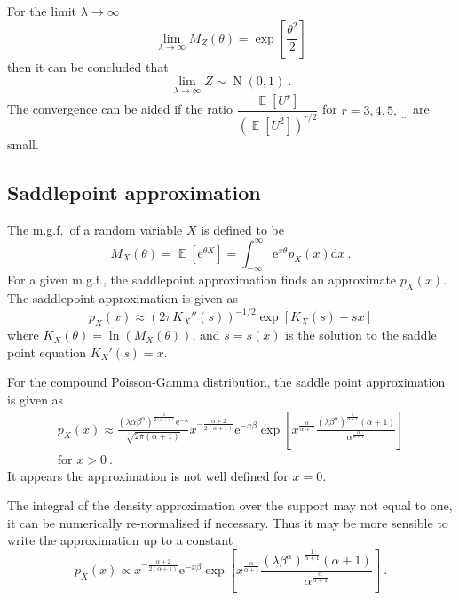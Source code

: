 \documentclass[12pt, a4paper]{memoir}
\DeclareMathOperator{\expectation}{\mathbb{E}}
\DeclareMathOperator{\normal}{N}
\newcommand{\euler}{\mathrm{e}}
\newcommand{\diff}{\mathrm{d}}
\newcommand{\dotdotdot}{_{\phantom{.}\cdots}}
\begin{document}
For the limit $\lambda\rightarrow\infty$
\begin{equation}
	\lim_{\lambda\rightarrow\infty}M_Z(\theta) = \exp\left[\frac{\theta^2}{2}\right]
\end{equation}
then it can be concluded that
\begin{equation}
	\lim_{\lambda\rightarrow\infty}Z\sim\normal(0,1)
	\ .
\end{equation}
The convergence can be aided if the ratio $\dfrac{\expectation[U^r]}{(\expectation[U^2])^{r/2}}$ for $r=3,4,5,\dotdotdot$ are small.

\subsection{Saddlepoint approximation}
The m.g.f.~of a random variable $X$ is defined to be
\begin{equation}
	M_X(\theta)=\expectation[\euler^{\theta X}]
	=
	\int_{-\infty}^{\infty}\euler^{x\theta} p_X(x) \diff x
	\ .
\end{equation}
For a given m.g.f., the saddlepoint approximation \citep{daniels1954saddlepoint} \citep{butler2007saddlepoint} finds an approximate $p_X(x)$. The saddlepoint approximation is given as
\begin{equation}
	p_X(x)\approx\left(2\pi K_X''(s)\right)^{-1/2}\exp\left[K_X(s)-sx\right]
	\label{eq:saddlePoint:generalSaddlePoint}
\end{equation}
where $K_X(\theta) = \ln\left(M_X(\theta)\right)$, and $s=s(x)$ is the solution to the saddle point equation $K_X'(s)=x$.

For the compound Poisson-Gamma distribution, the saddle point approximation is given as 
\begin{multline}
	p_X(x)\approx
	\frac{\left(\lambda\alpha\beta^\alpha\right)^{\frac{1}{2(\alpha+1)}}\euler^{-\lambda}}{\sqrt{2\pi(\alpha+1)}}x^{-\frac{\alpha+2}{2(\alpha+1)}}
	\euler^{-x\beta}
	\exp\left[x^{\frac{\alpha}{\alpha+1}}
		\frac{(\lambda\beta^\alpha)^{\frac{1}{\alpha+1}}(\alpha+1)}{\alpha^{\frac{\alpha}{\alpha+1}}}
	\right]
	\\
	\text{for }x>0 \ .
	\label{eq:saddle_point_approx}
\end{multline}
It appears the approximation is not well defined for $x=0$.

The integral of the density approximation over the support may not equal to one, it can be numerically re-normalised if necessary. Thus it may be more sensible to write the approximation up to a constant
\begin{equation}
	p_X(x)\propto x^{-\frac{\alpha+2}{2(\alpha+1)}}\euler^{-x\beta}
	\exp\left[
		x^{\frac{\alpha}{\alpha+1}}
		\frac{
			(\lambda\beta^\alpha)^{\frac{1}{\alpha+1}}(\alpha+1)
		}
		{
			\alpha^{\frac{\alpha}{\alpha+1}}
		}
	\right]
	\ .
\end{equation}
\end{document}
